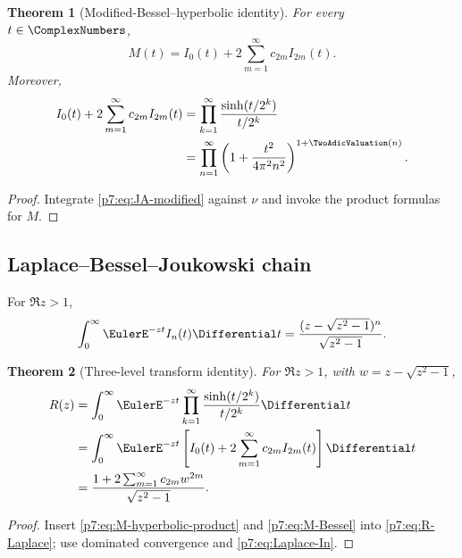 \documentclass[11pt]{article}
\newtheorem{theorem}{Theorem}[section]
\theoremstyle{definition}
\theoremstyle{remark}
\begin{document}
\begin{theorem}[Modified-Bessel--hyperbolic identity]
\label{p7:thm:Bessel-M}
For every \(t\in\ComplexNumbers\),
\begin{equation}
 \boxed{\displaystyle
 M(t)=I_0(t)+2\sum_{m=1}^{\infty}c_{2m}I_{2m}(t).}
 \label{p7:eq:M-Bessel}
\end{equation}
Moreover,
\begin{align}
 I_0(t)+2\sum_{m=1}^{\infty}c_{2m}I_{2m}(t)
 &=\prod_{k=1}^{\infty}\frac{\sinh(t/2^k)}{t/2^k}
 \label{p7:eq:IBessel-hyperbolic}\\
 &=\prod_{n=1}^{\infty}\left(1+\frac{t^2}{4\pi^2n^2}\right)^{1+\TwoAdicValuation(n)}.
 \label{p7:eq:IBessel-canonical}
\end{align}
\end{theorem}

\begin{proof}
Integrate \eqref{p7:eq:JA-modified} against \(\nu\) and invoke the product formulas for \(M\).
\end{proof}

\subsection{Laplace--Bessel--Joukowski chain}

For \(\Re z>1\),
\begin{equation}
 \int_0^{\infty}\EulerE^{-zt}I_n(t)\Differential t
 =\frac{(z-\sqrt{z^2-1})^n}{\sqrt{z^2-1}}.
 \label{p7:eq:Laplace-In}
\end{equation}

\begin{theorem}[Three-level transform identity]
\label{p7:thm:Laplace-Bessel-Jouk}
For \(\Re z>1\), with \(w=z-\sqrt{z^2-1}\),
\begin{align}
 R(z)
 &=\int_0^{\infty}\EulerE^{-zt}
 \prod_{k=1}^{\infty}\frac{\sinh(t/2^k)}{t/2^k}\Differential t
 \label{p7:eq:R-Laplace-product-new}\\
 &=\int_0^{\infty}\EulerE^{-zt}\left[I_0(t)+2\sum_{m=1}^{\infty}c_{2m}I_{2m}(t)\right]\Differential t
 \label{p7:eq:R-Laplace-Bessel}\\
 &=\frac{1+2\sum_{m=1}^{\infty}c_{2m}w^{2m}}{\sqrt{z^2-1}}.
 \label{p7:eq:R-Laplace-Jouk}
\end{align}
\end{theorem}

\begin{proof}
Insert \eqref{p7:eq:M-hyperbolic-product} and \eqref{p7:eq:M-Bessel} into
\eqref{p7:eq:R-Laplace}; use dominated convergence and \eqref{p7:eq:Laplace-In}.
\end{proof}
\end{document}

